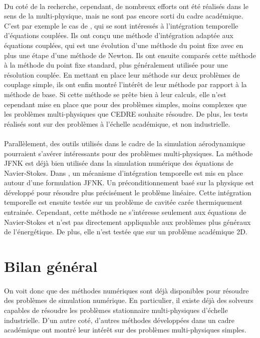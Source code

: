     \paragraph{}
    Du coté de la recherche, cependant, de nombreux efforts ont été réalisés dans le sens de la multi-physique, mais ne sont pas encore sorti du cadre académique.
    C'est par exemple le cas de \cite{WongKwokHorneEtAl2019}, qui se sont intéressés à l'intégration temporelle d'équations couplées.
    Ils ont conçu une méthode d'intégration adaptée aux équations couplées, qui est une évolution d'une méthode du point fixe avec en plus une étape d'une méthode de Newton.
    Ils ont ensuite comparés cette méthode à la méthode du point fixe standard, plus généralement utilisée pour une résolution couplée.
    En mettant en place leur méthode sur deux problèmes de couplage simple, ils ont enfin montré l’intérêt de leur méthode par rapport à la méthode de base.
    Si cette méthode se prête bien à leur calculs, elle n'est cependant mise en place que pour des problèmes simples, moins complexes que les problèmes multi-physiques que CEDRE souhaite résoudre.
    De plus, les tests réalisés sont sur des problèmes à l'échelle académique, et non industrielle.

    \paragraph{}
    Parallèlement, des outils utilisés dans le cadre de la simulation aérodynamique pourraient s'avérer intéressants pour des problèmes multi-physiques.
    La méthode JFNK est déjà bien utilisée dans la simulation numérique des équations de Navier-Stokes.
    Dans \cite{ParkNourgalievMartineauEtAl2009}, un mécanisme d'intégration temporelle est mis en place autour d'une formulation JFNK.
    Un préconditionnement basé sur la physique est développé pour résoudre plus précisément le problème linéaire.
    Cette intégration temporelle est ensuite testée sur un problème de cavitée carée thermiquement entrainée.
    Cependant, cette méthode ne s'intéresse seulement aux équations de Navier-Stokes et n'est pas directement appliquable aux problèmes plus généraux de l'énergétique.
    De plus, elle n'est testée que sur un problème académique 2D.

  \section*{Bilan général}

    \paragraph{}
    On voit donc que des méthodes numériques sont déjà disponibles pour résoudre des problèmes de simulation numérique.
    En particulier, il existe déjà des solveurs capables de résoudre les problèmes stationnaire multi-physiques d'échelle industrielle.
    D'un autre coté, d'autres méthodes développées dans un cadre académique ont montré leur intérêt sur des problèmes multi-physiques simples.

